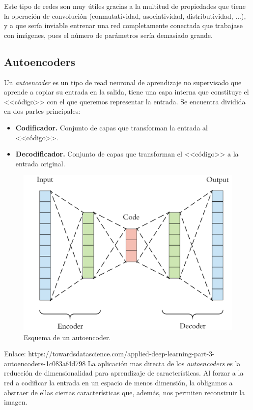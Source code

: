 \documentclass[
  a4paper,
  12pt,
  spanish,
]{scrartcl}
\theoremstyle{teorema-style}
\begin{document}
Este tipo de redes son muy útiles gracias a la multitud de propiedades que tiene la operación de convolución (conmutatividad, asociatividad, distributividad, ...), y a que sería inviable entrenar una red completamente conectada que trabajase con imágenes, pues el número de parámetros sería demasiado grande.

\subsection{Autoencoders}

Un \textit{autoencoder} es un tipo de read neuronal de aprendizaje no supervisado que aprende a copiar su entrada en la
salida, tiene una capa interna que constituye el <<código>> con
el que queremos representar la entrada. Se encuentra dividida en dos partes principales:
\begin{itemize}
  \item \textbf{Codificador.} Conjunto de capas que transforman la entrada al <<código>>.
  \item \textbf{Decodificador.} Conjunto de capas que transforman el <<código>> a la entrada original.
\end{itemize}

\begin{figure}[h]
  \centering
  \includegraphics[width=.8\textwidth]{img/autoencoder}
  \caption{Esquema de un autoencoder.}
  \label{fig:autoencoder}
\end{figure}
Enlace: https://towardsdatascience.com/applied-deep-learning-part-3-autoencoders-1c083af4d798
La aplicación mas directa de los \textit{autoencoders} es la reducción de
dimensionalidad para aprendizaje de características. Al forzar a la red a
codificar la entrada en un espacio de menos dimensión, la obligamos a abstraer
de ellas ciertas características que, además, nos permiten reconstruir la
imagen.
\end{document}
